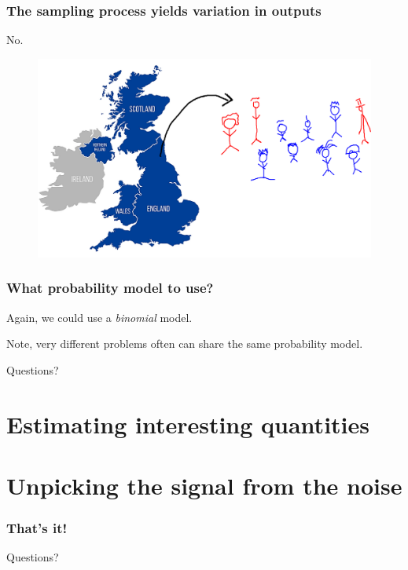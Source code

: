 \documentclass[handout]{beamer}
\begin{document}
\begin{frame}
	\frametitle{The sampling process yields variation in outputs}
	No.
	
	\begin{figure}[ht]
		\centerline{\includegraphics[width=1\textwidth]{./figures/uk-population.pdf}}
	\end{figure}
	
\end{frame}

\begin{frame}
	\frametitle{What probability model to use?}
	
	Again, we could use a \textit{binomial} model.
	
	\vspace{0.5cm}
	
	Note, very different problems often can share the same probability model.
	
\end{frame}

\begin{frame}
	
	\Large Questions?
\end{frame}

\section{Estimating interesting quantities}
\frame{\tableofcontents[currentsection]}


\section{Unpicking the signal from the noise}
\frame{\tableofcontents[currentsection]}


\begin{frame}
	\frametitle{That's it!}
	
	\Large Questions?
\end{frame}
\end{document}
